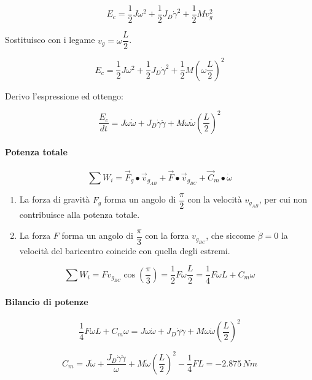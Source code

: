 \documentclass[main.tex]{subfiles}
\begin{document}
\[
E_c = \dfrac{1}{2}J\omega^2 + \dfrac{1}{2}J_D\dot{\gamma}^2 + \dfrac{1}{2}Mv_g^2
\]

Sostituisco con i legame $v_g = \omega \dfrac{L}{2} $.

\[
E_c = \dfrac{1}{2}J\omega^2 + \dfrac{1}{2}J_D\dot{\gamma}^2 + \dfrac{1}{2}M(\omega \dfrac{L}{2})^2
\]

Derivo l'espressione ed ottengo:

\[
\dfrac{E_c}{dt} = J\omega\dot{\omega} + J_D\dot{\gamma}\ddot{\gamma} + M\omega\dot{\omega}(\dfrac{L}{2})^2
\]

\paragraph{Potenza totale}

\[
\sum W_i = \vec{F}_g\bullet\vec{v}_{g_{AB}} + \vec{F}\bullet\vec{v}_{g_{BC}} + \vec{C}_m\bullet\dot{\omega}
\]

\begin{enumerate}
\item La forza di gravità $F_g$ forma un angolo di $\dfrac{\pi}{2}$ con la velocità $v_{g_{AB}}$, per cui non contribuisce alla potenza totale.
\item La forza $F$ forma un angolo di $\dfrac{\pi}{3}$ con la forza $v_{g_{BC}}$, che siccome $\dot{\beta} = 0$ la velocità del baricentro coincide con quella degli estremi.
\end{enumerate}

\[
\sum W_i = Fv_{g_{BC}}\cos\left ( \dfrac{\pi}{3} \right ) = \dfrac{1}{2}F\omega \dfrac{L}{2} = \dfrac{1}{4}F\omega L + C_m\omega
\]

\paragraph{Bilancio di potenze}

\[
	\dfrac{1}{4}F\omega L + C_m\omega = J\omega\dot{\omega} + J_D\dot{\gamma}\ddot{\gamma} + M\omega\dot{\omega}(\dfrac{L}{2})^2
\]

\[
	C_m = J\dot{\omega} + \dfrac{J_D\dot{\gamma}\ddot{\gamma}}{\omega} + M\dot{\omega}(\dfrac{L}{2})^2 - \dfrac{1}{4}F L = -2.875\,Nm
\]
\end{document}
